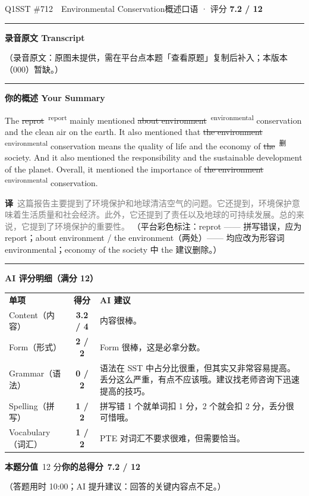 \documentclass[11pt]{article}
\newcommand{\fix}[2]{%
  \colorbox{cWrongBg}{\textcolor{cWrong}{\sout{#1}}}%
  \,\textsuperscript{\textcolor{cFix}{\footnotesize #2}}}
\newcommand{\del}[1]{%
  \colorbox{cDelBg}{\textcolor{cDelete}{\sout{#1}}}%
  \,\textsuperscript{\textcolor{cDelete}{\footnotesize 删}}}
\newcommand{\sfull}[1]{\textcolor{cFix}{\bfseries #1}}     %
\newcommand{\spart}[1]{\textcolor{cPartial}{\bfseries #1}} %
\newcommand{\szero}[1]{\textcolor{cWrong}{\bfseries #1}}   %
\newcommand{\ptesub}[1]{%
  \par\needspace{2\baselineskip}\smallskip
  {\color{cAccent}\rule[-0.2ex]{3pt}{1.05em}}\hspace{6pt}%
  {\bfseries\color{cHead}#1}\par\nopagebreak\smallskip}
\newcommand{\zh}[1]{{\footnotesize\textcolor{cNote}{\textbf{译}}\ \textcolor{gray}{#1}}}
\begin{document}

\begin{qblock}{Q1\quad SST \#712\ \ Environmental Conservation}{概述口语 · 评分 \textcolor{cAccent}{\bfseries 7.2 / 12}}
\ptesub{录音原文 Transcript}
\begin{promptbox}
{\color{cWrong}（录音原文：原图未提供，需在平台点本题「查看原题」复制后补入；本版本（000）暂缺。）}
\end{promptbox}
\ptesub{你的概述 Your Summary}
\begin{youbox}
The \fix{reprot}{report} mainly mentioned \fix{about environment}{environmental} conservation and the clean air on the earth. It also mentioned that \fix{the environment}{environmental} conservation means the quality of life and the economy of \del{the} society. And it also mentioned the responsibility and the sustainable development of the planet. Overall, it mentioned the importance of \fix{the environment}{environmental} conservation.
\end{youbox}
\zh{这篇报告主要提到了环境保护和地球清洁空气的问题。它还提到，环境保护意味着生活质量和社会经济。此外，它还提到了责任以及地球的可持续发展。总的来说，它提到了环境保护的重要性。}
{\footnotesize\color{gray}（平台彩色标注：reprot —— 拼写错误，应为 report；about environment / the environment（两处）—— 均应改为形容词 environmental；economy of the society 中 the 建议删除。）}
\ptesub{AI 评分明细（满分 12）}
\begin{notebox}
{\renewcommand{\arraystretch}{1.35}
\begin{tabularx}{\linewidth}{@{}l c Z@{}}
\textbf{单项} & \textbf{得分} & \textbf{AI 建议}\\[2pt]
Content（内容）& \spart{3.2 / 4} & 内容很棒。\\
Form（形式）& \sfull{2 / 2} & Form 很棒，这是必拿分数。\\
Grammar（语法）& \szero{0 / 2} & 语法在 SST 中占分比很重，但其实又非常容易提高。丢分这么严重，有点不应该哦。建议找老师咨询下迅速提高的技巧。\\
Spelling（拼写）& \spart{1 / 2} & 拼写错 1 个就单词扣 1 分，2 个就会扣 2 分，丢分很可惜哦。\\
Vocabulary（词汇）& \spart{1 / 2} & PTE 对词汇不要求很难，但需要恰当。\\
\end{tabularx}}
\smallskip
\textbf{本题分值}\ 12 分\qquad\textbf{你的总得分}\ \textcolor{cAccent}{\bfseries 7.2 / 12}
\end{notebox}
\smallskip
{\footnotesize\color{gray}（答题用时 10:00；AI 提升建议：回答的关键内容点不足。）}
\end{qblock}
\end{document}

